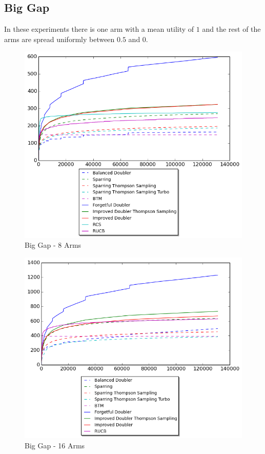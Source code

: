 \documentclass[MSc,beforeExam]{iitcsthesis}
\begin{document}
\subsection{Big Gap}
In these experiments there is one arm with a mean utility of $1$ and the rest of the arms are spread uniformly between $0.5$ and $0$.
\begin{figure}[h!]
\centering
  \includegraphics[scale=0.8]{graphs/one_strong_arm_8.png}
  \caption{Big Gap - 8 Arms}
\end{figure}
\newpage
\begin{figure}[h!]
\centering
  \includegraphics[scale=0.8]{graphs/one_strong_arm_16.png}
  \caption{Big Gap - 16 Arms}
\end{figure}
\end{document}
